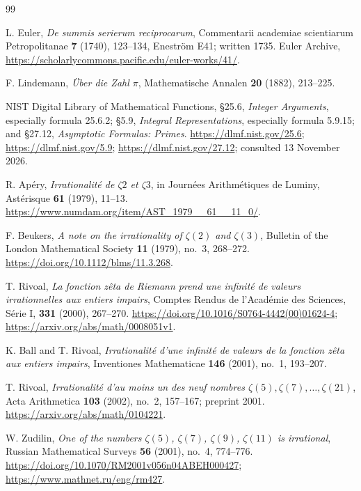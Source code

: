 \documentclass[11pt,letterpaper]{article}
\theoremstyle{definition}
\begin{document}
\newpage


\begingroup
\raggedright
\begin{thebibliography}{99}
\setlength{\itemsep}{0pt}

L. Euler, \emph{De summis serierum reciprocarum}, Commentarii academiae
scientiarum Petropolitanae \textbf{7} (1740), 123--134, Enestr\"om E41;
written 1735.  Euler Archive,
\url{https://scholarlycommons.pacific.edu/euler-works/41/}.

F. Lindemann, \emph{\"Uber die Zahl $\pi$}, Mathematische Annalen
\textbf{20} (1882), 213--225.

NIST Digital Library of Mathematical Functions, \S25.6, \emph{Integer
Arguments}, especially formula 25.6.2;
\S5.9, \emph{Integral Representations}, especially formula 5.9.15;
and \S27.12, \emph{Asymptotic Formulas: Primes}.
\url{https://dlmf.nist.gov/25.6};
\url{https://dlmf.nist.gov/5.9};
\url{https://dlmf.nist.gov/27.12}; consulted 13 November 2026.

R. Ap\'ery, \emph{Irrationalit\'e de $\zeta 2$ et $\zeta 3$}, in
Journ\'ees Arithm\'etiques de Luminy, Ast\'erisque \textbf{61} (1979),
11--13. \url{https://www.numdam.org/item/AST_1979__61__11_0/}.

F. Beukers, \emph{A note on the irrationality of $\zeta(2)$ and
$\zeta(3)$}, Bulletin of the London Mathematical Society \textbf{11}
(1979), no.~3, 268--272. \url{https://doi.org/10.1112/blms/11.3.268}.

T. Rivoal, \emph{La fonction z\^eta de Riemann prend une infinit\'e de
valeurs irrationnelles aux entiers impairs}, Comptes Rendus de
l'Acad\'emie des Sciences, S\'erie I, \textbf{331} (2000), 267--270.
\url{https://doi.org/10.1016/S0764-4442(00)01624-4};
\url{https://arxiv.org/abs/math/0008051v1}.

K. Ball and T. Rivoal, \emph{Irrationalit\'e d'une infinit\'e de valeurs
de la fonction z\^eta aux entiers impairs}, Inventiones Mathematicae
\textbf{146} (2001), no.~1, 193--207.

T. Rivoal, \emph{Irrationalit\'e d'au moins un des neuf nombres
$\zeta(5),\zeta(7),\ldots,\zeta(21)$}, Acta Arithmetica \textbf{103}
(2002), no.~2, 157--167; preprint 2001.
\url{https://arxiv.org/abs/math/0104221}.

W. Zudilin, \emph{One of the numbers $\zeta(5)$, $\zeta(7)$,
$\zeta(9)$, $\zeta(11)$ is irrational}, Russian Mathematical Surveys
\textbf{56} (2001), no.~4, 774--776.
\url{https://doi.org/10.1070/RM2001v056n04ABEH000427};
\url{https://www.mathnet.ru/eng/rm427}.


\end{thebibliography}
\end{document}
